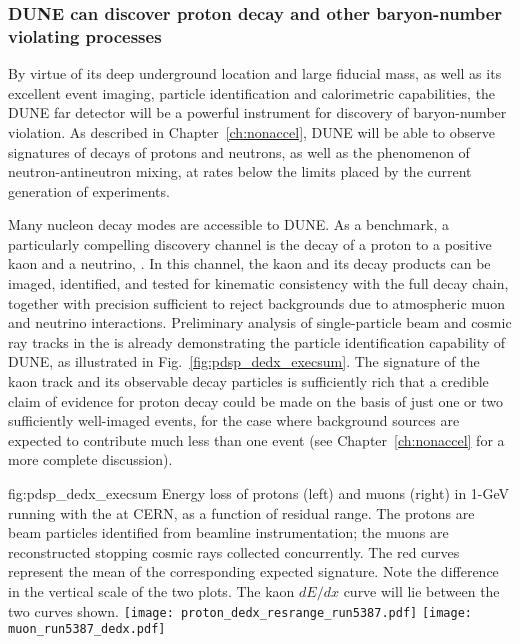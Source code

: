 \subsubsection{DUNE can discover proton decay and other 
baryon-number violating processes}

By virtue of its deep underground location and large fiducial 
mass, as well as its excellent event imaging, particle 
identification and 
calorimetric capabilities, the DUNE far detector will be 
a powerful instrument for discovery of baryon-number violation.
As described in Chapter~\ref{ch:nonaccel}, DUNE will be able 
to observe signatures of decays of protons and neutrons, 
as well as the phenomenon of neutron-antineutron mixing, at 
rates below the limits placed by the current generation of 
experiments.

Many nucleon decay modes are accessible to DUNE.  
As a benchmark, a particularly compelling discovery channel 
is the decay of a proton to a positive kaon and a neutrino, 
\ptoknubar.  In this channel, the kaon and its decay products 
can be imaged, identified, and tested for kinematic consistency 
with the full decay chain, together with precision sufficient to 
reject backgrounds due to atmospheric muon and neutrino 
interactions. 
Preliminary analysis of single-particle beam and cosmic ray tracks 
in the  \lartpc is already demonstrating the particle 
identification capability of DUNE, as illustrated in 
Fig.~\ref{fig:pdsp_dedx_execsum}.  
The signature of the kaon track and its observable decay particles is 
sufficiently rich that a credible claim of evidence for 
proton decay could be made on the basis of just 
one or two sufficiently well-imaged events, for the case 
where background sources are expected to contribute much less 
than one event (see Chapter~\ref{ch:nonaccel} for a more complete 
discussion). 

\begin{dunefigure}{fig:pdsp_dedx_execsum}
{Energy loss of protons (left) and muons (right) in 1-GeV  
running with the  \lartpc at CERN, as a function of 
residual range.  The protons are beam particles identified from 
beamline instrumentation; the muons are reconstructed stopping 
cosmic rays collected concurrently.  
The red curves represent the mean of the 
corresponding expected signature.  Note the difference in 
the vertical scale of the two plots.  The kaon $dE/dx$ curve 
will lie between the two curves shown.}
\texttt{[image: proton\_dedx\_resrange\_run5387.pdf]}\hspace{0.05\linewidth}
\texttt{[image: muon\_run5387\_dedx.pdf]}
\end{dunefigure}

